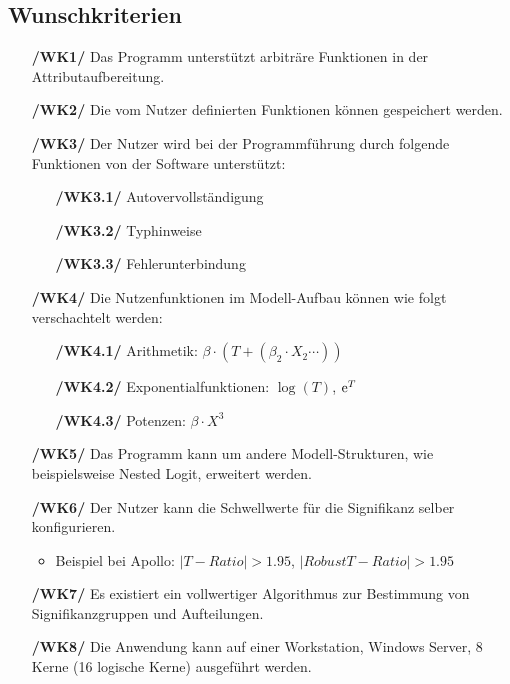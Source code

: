 \documentclass{article}
\begin{document}
\subsection{Wunschkriterien}
\begin{itemize}
    \item[\textbf{/WK1/}] Das Programm unterstützt arbiträre Funktionen in der Attributaufbereitung.
    \item[\textbf{/WK2/}] Die vom Nutzer definierten Funktionen können gespeichert werden.
    \item[\textbf{/WK3/}] Der Nutzer wird bei der Programmführung durch folgende Funktionen von der Software unterstützt:
    \begin{itemize}[leftmargin=.7in]
        \item[\textbf{/WK3.1/}] Autovervollständigung
        \item[\textbf{/WK3.2/}] Typhinweise
        \item[\textbf{/WK3.3/}] Fehlerunterbindung
    \end{itemize}

    \item[\textbf{/WK4/}] Die Nutzenfunktionen im Modell-Aufbau können wie folgt verschachtelt werden:
    \begin{itemize}[leftmargin=.7in]
        \item[\textbf{/WK4.1/}] Arithmetik: $\beta \cdot (T + (\beta_2 \cdot X_2 \cdots))$
        \item[\textbf{/WK4.2/}] Exponentialfunktionen: $\log(T)$, ${\rm e}^T$
        \item[\textbf{/WK4.3/}] Potenzen: $\beta \cdot X^3$
    \end{itemize}
    \item[\textbf{/WK5/}] Das Programm kann um andere Modell-Strukturen, wie beispielsweise Nested Logit, erweitert werden.
    \item[\textbf{/WK6/}] Der Nutzer kann die Schwellwerte für die Signifikanz selber konfigurieren.
    \begin{itemize}
        \item Beispiel bei Apollo: $|T-Ratio | > 1.95$, $|Robust T-Ratio | > 1.95$
    \end{itemize}    
    \item[\textbf{/WK7/}] Es existiert ein vollwertiger Algorithmus zur Bestimmung von Signifikanzgruppen und Aufteilungen.
    \item[\textbf{/WK8/}] Die Anwendung kann auf einer Workstation, Windows Server, 8 Kerne (16 logische Kerne) ausgeführt werden. 
    
\end{itemize}
\end{document}
